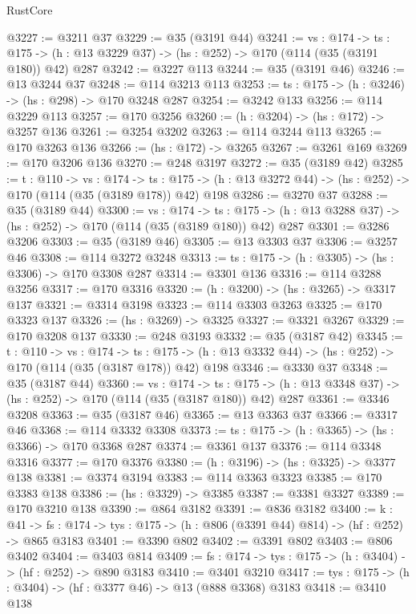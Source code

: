 \begin{lexlean}{RustCore}
\begin{coremodule}
@3227 := @3211 @37
@3229 := @35 (@3191 @44)
@3241 := {vs : @174} ->
  {ts : @175} -> (h : @13 @3229 @37) -> (hs : @252) -> @170 (@114 (@35 (@3191 @180)) @42) @287
@3242 := @3227 @113
@3244 := @35 (@3191 @46)
@3246 := @13 @3244 @37
@3248 := @114 @3213 @113
@3253 := {ts : @175} -> (h : @3246) -> (hs : @298) -> @170 @3248 @287
@3254 := @3242 @133
@3256 := @114 @3229 @113
@3257 := @170 @3256
@3260 := (h : @3204) -> (hs : @172) -> @3257 @136
@3261 := @3254 @3202
@3263 := @114 @3244 @113
@3265 := @170 @3263 @136
@3266 := (hs : @172) -> @3265
@3267 := @3261 @169
@3269 := @170 @3206 @136
@3270 := @248 @3197
@3272 := @35 (@3189 @42)
@3285 := {t : @110} ->
  {vs : @174} ->
  {ts : @175} -> (h : @13 @3272 @44) -> (hs : @252) -> @170 (@114 (@35 (@3189 @178)) @42) @198
@3286 := @3270 @37
@3288 := @35 (@3189 @44)
@3300 := {vs : @174} ->
  {ts : @175} -> (h : @13 @3288 @37) -> (hs : @252) -> @170 (@114 (@35 (@3189 @180)) @42) @287
@3301 := @3286 @3206
@3303 := @35 (@3189 @46)
@3305 := @13 @3303 @37
@3306 := @3257 @46
@3308 := @114 @3272 @3248
@3313 := {ts : @175} -> (h : @3305) -> (hs : @3306) -> @170 @3308 @287
@3314 := @3301 @136
@3316 := @114 @3288 @3256
@3317 := @170 @3316
@3320 := (h : @3200) -> (hs : @3265) -> @3317 @137
@3321 := @3314 @3198
@3323 := @114 @3303 @3263
@3325 := @170 @3323 @137
@3326 := (hs : @3269) -> @3325
@3327 := @3321 @3267
@3329 := @170 @3208 @137
@3330 := @248 @3193
@3332 := @35 (@3187 @42)
@3345 := {t : @110} ->
  {vs : @174} ->
  {ts : @175} -> (h : @13 @3332 @44) -> (hs : @252) -> @170 (@114 (@35 (@3187 @178)) @42) @198
@3346 := @3330 @37
@3348 := @35 (@3187 @44)
@3360 := {vs : @174} ->
  {ts : @175} -> (h : @13 @3348 @37) -> (hs : @252) -> @170 (@114 (@35 (@3187 @180)) @42) @287
@3361 := @3346 @3208
@3363 := @35 (@3187 @46)
@3365 := @13 @3363 @37
@3366 := @3317 @46
@3368 := @114 @3332 @3308
@3373 := {ts : @175} -> (h : @3365) -> (hs : @3366) -> @170 @3368 @287
@3374 := @3361 @137
@3376 := @114 @3348 @3316
@3377 := @170 @3376
@3380 := (h : @3196) -> (hs : @3325) -> @3377 @138
@3381 := @3374 @3194
@3383 := @114 @3363 @3323
@3385 := @170 @3383 @138
@3386 := (hs : @3329) -> @3385
@3387 := @3381 @3327
@3389 := @170 @3210 @138
@3390 := @864 @3182
@3391 := @836 @3182
@3400 := {k : @41} ->
  {fs : @174} -> {tys : @175} -> (h : @806 (@3391 @44) @814) -> (hf : @252) -> @865 @3183
@3401 := @3390 @802
@3402 := @3391 @802
@3403 := @806 @3402
@3404 := @3403 @814
@3409 := {fs : @174} -> {tys : @175} -> (h : @3404) -> (hf : @252) -> @890 @3183
@3410 := @3401 @3210
@3417 := {tys : @175} -> (h : @3404) -> (hf : @3377 @46) -> @13 (@888 @3368) @3183
@3418 := @3410 @138

\end{coremodule}
\end{lexlean}
